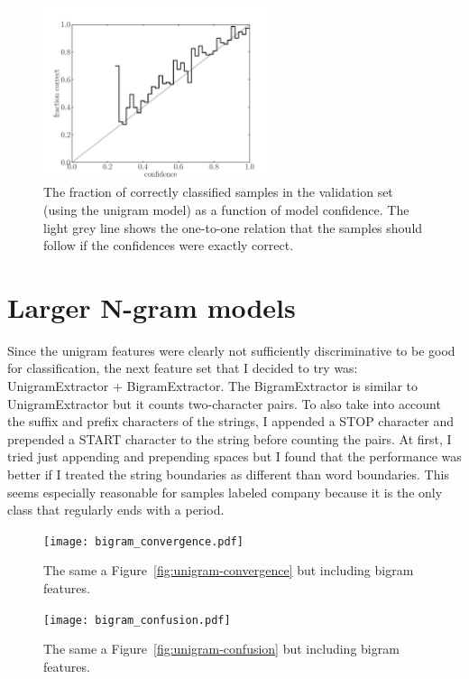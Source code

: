 \documentclass[11pt]{article}
\newcommand{\fig}[1]{Figure~\ref{fig:#1}}
\newcommand{\figlabel}[1]{\label{fig:#1}}
\newcommand{\code}[1]{{\sffamily #1}}
\begin{document}
\begin{figure}[htbp]
\begin{center}
    \includegraphics[width=0.6\textwidth]{unigram_confidence_scale.pdf}
\end{center}
\caption{%
The fraction of correctly classified samples in the validation set (using the
unigram model) as a function of model confidence.
The light grey line shows the one-to-one relation that the samples should
follow if the confidences were exactly correct.
\figlabel{unigram-confidence-scale}}
\end{figure}

\clearpage

\section{Larger N-gram models}

Since the unigram features were clearly not sufficiently discriminative to be
good for classification, the next feature set that I decided to try was:
\code{UnigramExtractor + BigramExtractor}.
The \code{BigramExtractor} is similar to \code{UnigramExtractor} but it counts
two-character pairs.
To also take into account the suffix and prefix characters of the strings, I
appended a \code{STOP} character and prepended a \code{START} character to the
string before counting the pairs.
At first, I tried just appending and prepending spaces but I found that the
performance was better if I treated the string boundaries as different than
word boundaries.
This seems especially reasonable for samples labeled \code{company} because
it is the only class that regularly ends with a period.

\begin{figure}[htbp]
\begin{center}
    \texttt{[image: bigram\_convergence.pdf]}
\end{center}
\caption{%
The same a \fig{unigram-convergence} but including bigram features.
\figlabel{bigram-convergence}}
\end{figure}

\begin{figure}[htbp]
\begin{center}
    \texttt{[image: bigram\_confusion.pdf]}
\end{center}
\caption{%
The same a \fig{unigram-confusion} but including bigram features.
\figlabel{bigram-confusion}}
\end{figure}
\end{document}
